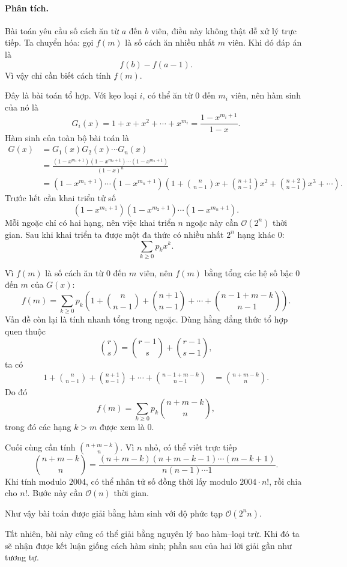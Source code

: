 \documentclass[11pt]{article}
\newcommand{\Oh}{\mathcal{O}}
\newcommand{\C}[2]{\binom{#1}{#2}}
\begin{document}
\paragraph{Phân tích.}
Bài toán yêu cầu số cách ăn từ \(a\) đến \(b\) viên, điều này không thật dễ xử
lý trực tiếp. Ta chuyển hóa: gọi \(f(m)\) là số cách ăn nhiều nhất \(m\) viên.
Khi đó đáp án là
\[
  f(b)-f(a-1).
\]
Vì vậy chỉ cần biết cách tính \(f(m)\).

Đây là bài toán tổ hợp. Với kẹo loại \(i\), có thể ăn từ \(0\) đến \(m_i\)
viên, nên hàm sinh của nó là
\[
  G_i(x)=1+x+x^2+\cdots+x^{m_i}
        =\frac{1-x^{m_i+1}}{1-x}.
\]
Hàm sinh của toàn bộ bài toán là
\[
\begin{aligned}
  G(x)
  &=G_1(x)G_2(x)\cdots G_n(x)\\
  &=\frac{(1-x^{m_1+1})(1-x^{m_2+1})\cdots(1-x^{m_n+1})}
          {(1-x)^n}\\
  &=(1-x^{m_1+1})\cdots(1-x^{m_n+1})
    \left(1+\C{n}{n-1}x+\C{n+1}{n-1}x^2
    +\C{n+2}{n-1}x^3+\cdots\right).
\end{aligned}
\]
Trước hết cần khai triển tử số
\[
  (1-x^{m_1+1})(1-x^{m_2+1})\cdots(1-x^{m_n+1}).
\]
Mỗi ngoặc chỉ có hai hạng, nên việc khai triển \(n\) ngoặc này cần
\(\Oh(2^n)\) thời gian. Sau khi khai triển ta được một đa thức có nhiều nhất
\(2^n\) hạng khác \(0\):
\[
  \sum_{k\ge0} p_k x^k.
\]

Vì \(f(m)\) là số cách ăn từ \(0\) đến \(m\) viên, nên \(f(m)\) bằng tổng các
hệ số bậc \(0\) đến \(m\) của \(G(x)\):
\[
  f(m)=\sum_{k\ge0}p_k
  \left(1+\C{n}{n-1}+\C{n+1}{n-1}+\cdots+\C{n-1+m-k}{n-1}\right).
\]
Vấn đề còn lại là tính nhanh tổng trong ngoặc. Dùng hằng đẳng thức tổ hợp quen
thuộc
\[
  \C{r}{s}=\C{r-1}{s}+\C{r-1}{s-1},
\]
ta có
\[
\begin{aligned}
  1+\C{n}{n-1}+\C{n+1}{n-1}+\cdots+\C{n-1+m-k}{n-1}
  &=\C{n+m-k}{n}.
\end{aligned}
\]
Do đó
\[
  f(m)=\sum_{k\ge0}p_k\C{n+m-k}{n},
\]
trong đó các hạng \(k>m\) được xem là \(0\).

Cuối cùng cần tính \(\C{n+m-k}{n}\). Vì \(n\) nhỏ, có thể viết trực tiếp
\[
  \C{n+m-k}{n}
  =
  \frac{(n+m-k)(n+m-k-1)\cdots(m-k+1)}
       {n(n-1)\cdots 1}.
\]
Khi tính modulo \(2004\), có thể nhân tử số đồng thời lấy modulo
\(2004\cdot n!\), rồi chia cho \(n!\). Bước này cần \(\Oh(n)\) thời gian.

Như vậy bài toán được giải bằng hàm sinh với độ phức tạp \(\Oh(2^n n)\).

Tất nhiên, bài này cũng có thể giải bằng nguyên lý bao hàm--loại trừ. Khi đó
ta sẽ nhận được kết luận giống cách hàm sinh; phần sau của hai lời giải gần
như tương tự.
\end{document}
